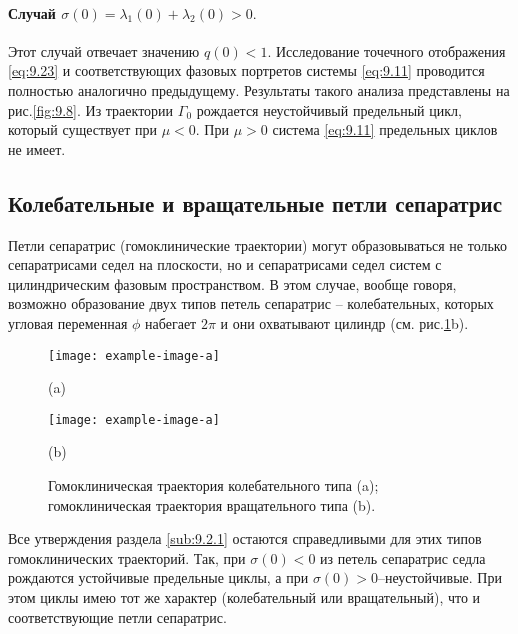 \paragraph{Случай $\sigma(0) = \lambda_1(0) + \lambda_2(0) >0.$}%

Этот случай отвечает значению $q(0) <1$. 
Исследование точечного отображения \eqref{eq:9.23} и соответствующих фазовых 
портретов системы \eqref{eq:9.11} проводится полностью аналогично предыдущему.
Результаты такого анализа представлены на рис.\ref{fig:9.8}. Из траектории $\Gamma_0$
рождается неустойчивый предельный цикл, который существует при $\mu<0$. При
$\mu>0$ система \eqref{eq:9.11} предельных циклов не имеет.

\subsection{Колебательные и вращательные петли сепаратрис}%
\label{sub:9.2.2}

Петли сепаратрис (гомоклинические траектории) могут образовываться не только
сепаратрисами седел на плоскости, но и сепаратрисами седел систем с 
цилиндрическим фазовым пространством. В этом случае, вообще говоря, возможно образование двух типов
петель сепаратрис -- колебательных, которых угловая переменная $\phi$ набегает $2\pi$ и они охватывают цилиндр (см. рис.\ref{fig:9.9}b).
\begin{figure}[h]
        \centering
        \begin{minipage}{0.49\linewidth}
                \centering 
                \texttt{[image: example-image-a]}

                (a)
        \end{minipage}
        \begin{minipage}{0.49\linewidth}
                \centering 
                \texttt{[image: example-image-a]}

                (b)
        \end{minipage}
        \caption{Гомоклиническая траектория колебательного типа (a); гомоклиническая траектория 
        вращательного типа (b).}
        \label{fig:9.9}
\end{figure}

Все утверждения раздела \ref{sub:9.2.1} остаются справедливыми для этих типов гомоклинических траекторий. Так, при $\sigma(0)<0$ из петель сепаратрис седла рождаются 
устойчивые предельные циклы, а при $\sigma(0)>0$--неустойчивые.
При этом циклы имею тот же характер (колебательный или вращательный), что и соответствующие петли 
сепаратрис.

